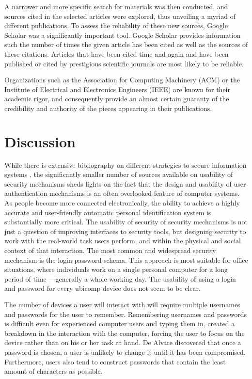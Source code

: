 \documentclass{article}
\begin{document}
A narrower and more specific search for materials was then conducted, and sources cited in the selected articles were explored, thus unveiling a myriad of different publications. To assess the reliability of these new sources, Google Scholar was a significantly important tool. Google Scholar provides information such the number of times the given article has been cited as well as the sources of these citations.  Articles that have been cited time and again and have been published or cited by prestigious scientific journals are most likely to be reliable.

Organizations such as the Association for Computing Machinery (ACM) or the Institute of Electrical and Electronics Engineers (IEEE) are known for their academic rigor, and consequently provide an almost certain guaranty of the credibility and authority of the pieces appearing in their publications. 


\section{Discussion}
While there is extensive bibliography on different strategies to secure information systems , the significantly smaller number of sources available on usability of security mechanisms sheds lights on the fact that the design and usability of user authentication mechanisms is an often overlooked feature of computer systems.
As people become more connected electronically, the ability to achieve a highly accurate and user-friendly automatic personal identification system is substantially more critical. \cite{jain} The usability of security of security mechanisms is not just a question of improving interfaces to security tools, but designing security to work with the real-world task users perform, and within the physical and social context of that interaction. 
The most common and widespread security mechanism is the login-password schema. This approach is most suitable for office situations, where individuals work on a single personal computer for a long period of time ---generally a whole working day. The usability of using a login and password for every ubicomp device does not seem to be clear. 

The number of devices a user will interact with will require multiple usernames and passwords for the user to remember. Remembering usernames and passwords is difficult even for experienced computer users and typing them in, created a breakdown in the interaction with the computer, forcing the user to focus on the device rather than on his or her task at hand.  De Alvare \cite{} discovered that once a password is chosen, a user is unlikely to change it until it has been compromised. Furthermore, users also tend to construct passwords that contain the least amount of characters as possible.
\end{document}
